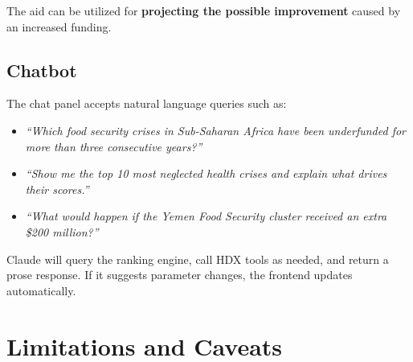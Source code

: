 \documentclass[11pt,a4paper]{article}
\begin{document}
The aid can be utilized for \textbf{projecting the possible improvement} caused by an increased funding.

\subsection{Chatbot}

The chat panel accepts natural language queries such as:

\begin{itemize}[nosep]
  \item \textit{``Which food security crises in Sub-Saharan Africa have been underfunded for more than three consecutive years?''}
  \item \textit{``Show me the top 10 most neglected health crises and explain what drives their scores.''}
  \item \textit{``What would happen if the Yemen Food Security cluster received an extra \$200 million?''}
\end{itemize}

Claude will query the ranking engine, call HDX tools as needed, and return a
prose response.  If it suggests parameter changes, the frontend updates automatically.

\section{Limitations and Caveats}
\end{document}
